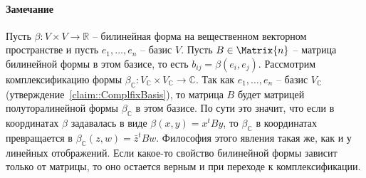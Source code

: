 \paragraph{Замечание}

Пусть $\beta\colon V\times V\to \mathbb R$ -- билинейная форма на вещественном векторном пространстве и пусть $e_1,\ldots,e_n$ -- базис $V$.
Пусть $B\in \Matrix{n}$ -- матрица билинейной формы в этом базисе, то есть $b_{ij} = \beta(e_i,e_j)$.
Рассмотрим комплексификацию формы $\beta_\mathbb C \colon V_\mathbb C\times V_\mathbb C\to \mathbb C$.
Так как $e_1,\ldots,e_n$ -- базис $V_\mathbb C$ (утверждение~\ref{claim::ComplfixBasis}), то матрица $B$ будет матрицей полуторалинейной формы $\beta_\mathbb C$ в этом базисе.
По сути это значит, что если в координатах $\beta$ задавалась в виде $\beta(x, y) = x^t B y$, то $\beta_\mathbb C$ в координатах превращается в $\beta_\mathbb C(z, w) = \bar z^t B w$.
Философия этого явления такая же, как и у линейных отображений.
Если какое-то свойство билинейной формы зависит только от матрицы, то оно остается верным и при переходе к комплексификации.
